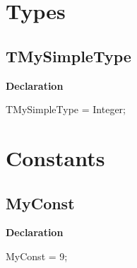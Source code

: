 \documentclass{report}
\newif\ifpdf
\begin{document}
\section{Types}
\ifpdf
\subsection*{\large{\textbf{TMySimpleType}}\normalsize\hspace{1ex}\hrulefill}
\else
\subsection*{TMySimpleType}
\fi
\label{ok_nodescription_printing-TMySimpleType}
\begin{list}{}{
\setlength{\itemindent}{0cm}
\setlength{\listparindent}{0cm}
\setlength{\leftmargin}{\evensidemargin}
\addtolength{\leftmargin}{\tmplength}
\settowidth{\labelsep}{X}
\addtolength{\leftmargin}{\labelsep}
\setlength{\labelwidth}{\tmplength}
}
\item[\textbf{Declaration}\hfill]
\ifpdf
\begin{flushleft}
\fi
\begin{ttfamily}
TMySimpleType = Integer;\end{ttfamily}

\ifpdf
\end{flushleft}
\fi

\end{list}
\section{Constants}
\ifpdf
\subsection*{\large{\textbf{MyConst}}\normalsize\hspace{1ex}\hrulefill}
\else
\subsection*{MyConst}
\fi
\label{ok_nodescription_printing-MyConst}
\begin{list}{}{
\setlength{\itemindent}{0cm}
\setlength{\listparindent}{0cm}
\setlength{\leftmargin}{\evensidemargin}
\addtolength{\leftmargin}{\tmplength}
\settowidth{\labelsep}{X}
\addtolength{\leftmargin}{\labelsep}
\setlength{\labelwidth}{\tmplength}
}
\item[\textbf{Declaration}\hfill]
\ifpdf
\begin{flushleft}
\fi
\begin{ttfamily}
MyConst = 9;\end{ttfamily}

\ifpdf
\end{flushleft}
\fi

\end{list}
\end{document}
